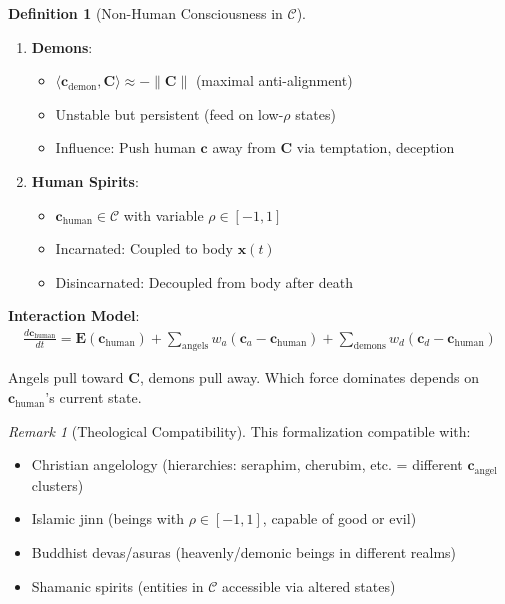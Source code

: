 \documentclass[11pt,a4paper]{article}
\theoremstyle{definition}
\newtheorem{definition}{Definition}[section]
\theoremstyle{remark}
\newtheorem{remark}{Remark}[section]
\newcommand{\CC}{\mathcal{C}}
\newcommand{\EE}{\mathbf{E}}
\newcommand{\cc}{\mathbf{c}}
\begin{document}
\begin{small}
\begin{enumerate}
\begin{definition}[Non-Human Consciousness in \(\CC\)]
\begin{enumerate}
    \item \textbf{Demons}:
        \begin{itemize}
            \item \(\langle \cc_{\text{demon}}, \mathbf{C} \rangle \approx -\|\mathbf{C}\|\) (maximal anti-alignment)
            \item Unstable but persistent (feed on low-\(\rho\) states)
            \item Influence: Push human \(\cc\) away from \(\mathbf{C}\) via temptation, deception
        \end{itemize}
    
    \item \textbf{Human Spirits}:
        \begin{itemize}
            \item \(\cc_{\text{human}} \in \CC\) with variable \(\rho \in [-1, 1]\)
            \item Incarnated: Coupled to body \(\mathbf{x}(t)\)
            \item Disincarnated: Decoupled from body after death
        \end{itemize}
\end{enumerate}

\textbf{Interaction Model}:
\begin{align}
\frac{d\cc_{\text{human}}}{dt} = \EE(\cc_{\text{human}}) + \sum_{\text{angels}} w_a(\cc_a - \cc_{\text{human}}) + \sum_{\text{demons}} w_d(\cc_d - \cc_{\text{human}})
\end{align}

Angels pull toward \(\mathbf{C}\), demons pull away. Which force dominates depends on \(\cc_{\text{human}}\)'s current state.
\end{definition}

\begin{remark}[Theological Compatibility]
This formalization compatible with:
\begin{itemize}
    \item Christian angelology (hierarchies: seraphim, cherubim, etc. = different \(\cc_{\text{angel}}\) clusters)
    \item Islamic jinn (beings with \(\rho \in [-1, 1]\), capable of good or evil)
    \item Buddhist devas/asuras (heavenly/demonic beings in different realms)
    \item Shamanic spirits (entities in \(\CC\) accessible via altered states)
\end{itemize}


\end{remark}
\end{enumerate}
\end{small}
\end{document}
